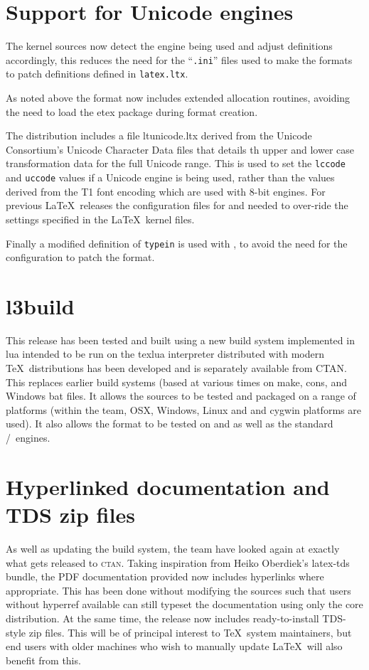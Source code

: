 \documentclass{ltnews}
\begin{document}
\section{Support for Unicode engines}

The kernel sources now detect the engine being used and adjust definitions
accordingly, this reduces the need for the ``\texttt{.ini}'' files used to make
the formats to patch definitions defined in \texttt{latex.ltx}.
 
As noted above the format now includes extended allocation routines, avoiding
the need to load the \textsf{etex} package during format creation.

The distribution includes a file \textsf{ltunicode.ltx} derived from the
Unicode Consortium's Unicode Character Data files that details th upper and
lower case transformation data for the full Unicode range. This is used to set
the \verb|lccode| and \verb|uccode| values if a Unicode engine is being used,
rather than the values derived from the T1 font encoding which are used with
8-bit engines. For previous \LaTeX\ releases the configuration files for
 and  needed to over-ride the settings specified
in the \LaTeX\ kernel files.

Finally a modified definition of \verb|typein| is used with , to
avoid the need for the  configuration to patch the format.

\section{l3build}

This release has been tested and built using a new build system implemented in
\textsf{lua} intended to be run on the \textsf{texlua} interpreter distributed
with modern \TeX\ distributions has been developed and is separately available
from CTAN. This replaces earlier build systems (based at various times on
\textsf{make}, \textsf{cons}, and Windows \textsf{bat} files. It allows the
sources to be tested and packaged on a range of platforms (within the team,
OSX, Windows, Linux and and cygwin platforms are used). It also allows the
format to be tested on  and  as well as the
standard /\eTeX\ engines.

\section{Hyperlinked documentation and TDS zip files}

As well as updating the build system, the team have looked again at exactly
what gets released to \textsc{ctan}. Taking inspiration from Heiko Oberdiek's
\textsf{latex-tds} bundle, the PDF documentation provided now includes
hyperlinks where appropriate. This has been done without modifying the sources
such that users without \textsf{hyperref} available can still typeset the
documentation using only the core distribution. At the same time, the release
now includes ready-to-install TDS-style zip files. This will be of principal
interest to \TeX\ system maintainers, but end users with older machines who
wish to manually update \LaTeX\ will also benefit from this.
\end{document}
